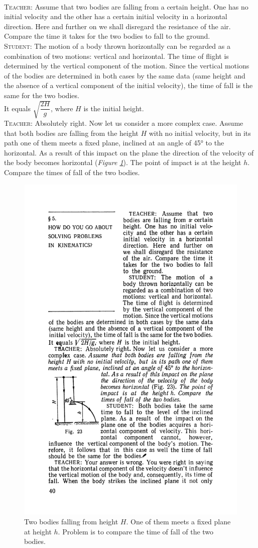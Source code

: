 \documentclass[a4paper,sfsidenotes]{tufte-book}
\begin{document}
\paragraph{}
\textsc{Teacher:} Assume that two bodies are falling from a certain height. One has no initial velocity and the other has a certain initial velocity in a horizontal direction. Here and further on
we shall disregard the resistance of the air. Compare the time it takes for the two bodies to fall
to the ground.\\
\textsc{Student:} The motion of a body thrown horizontally can be regarded as a combination of two motions: vertical and horizontal. The time of flight is determined by the vertical component of the
motion. Since the vertical motions of the bodies are determined in both cases by the same data (same height and the absence of a vertical component of the initial velocity), the time of fall is the same for the two bodies. \\
It equals $\sqrt{\dfrac{2H}{g}}$, where $H$ is the initial height.\\
\textsc{Teacher:} Absolutely right. Now let us consider a more complex case. Assume that both bodies are falling from the height $H$ with no initial velocity, but in its path one of them meets a fixed plane, inclined at an angle of \ang{45} to the horizontal. As a result of this impact on the plane the direction of the velocity of the body becomes horizontal (\emph{Figure \ref{fig-23}}). The point of impact is at the height $h$. Compare the times of fall of the two bodies.
\\
\begin{figure}
\centering
\includegraphics[angle=-1.2,width=0.4\linewidth]{fig-023a.pdf}
\caption{Two bodies falling from height $H$. One of them meets a fixed plane at height $h$. Problem is to compare the time of fall of the two bodies.}
\label{fig-23}
\end{figure}
\end{document}
